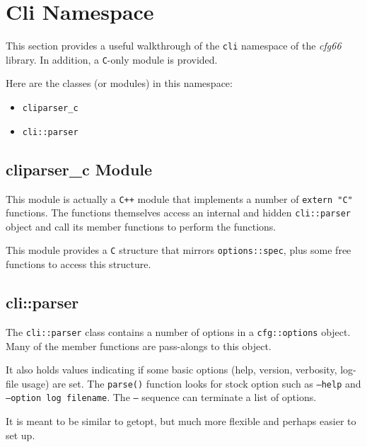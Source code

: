 %
%
%

\section{Cli Namespace}
\label{sec:cli_namespace}

   This section provides a useful walkthrough of the \texttt{cli} namespace of
   the \textsl{cfg66} library.
   In addition, a \texttt{C}-only module is provided.

   Here are the classes (or modules) in this namespace:

   \begin{itemize}
      \item \texttt{cliparser\_c}
      \item \texttt{cli::parser}
   \end{itemize}

\subsection{cliparser\_c Module}
\label{subsec:cli_namespace_c}

   This module is actually a \texttt{C++} module that implements a number of
   \texttt{extern "C"} functions.
   The functions themselves access an internal and hidden
   \texttt{cli::parser} object and call its member functions to
   perform the functions.

   This module provides a \texttt{C} structure that mirrors
   \texttt{options::spec}, plus some free functions to access this
   structure.

\subsection{cli::parser}
\label{subsec:cli_namespace_parser}

   The \texttt{cli::parser} class contains a number of options in a
   \texttt{cfg::options} object.
   Many of the member functions are pass-alongs to this object.

   It also holds values indicating if some basic options (help, version,
   verbosity, log-file usage) are set.
   The \texttt{parse()} function looks for stock option such as
   \texttt{--help} and \texttt{--option log filename}.
   The \texttt{--} sequence can terminate a list of options.

   It is meant to be similar to getopt, but much more flexible and
   perhaps easier to set up.

